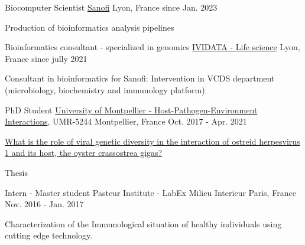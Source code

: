 

\begin{cventries}

 \cventry
    {Biocomputer Scientist} %
    {\href{https://www.sanofi.com/en}{Sanofi}} %
    {Lyon, France} %
    {since Jan. 2023} %
    {
      \begin{cvitems} %
        \item {Production of bioinformatics analysis pipelines}
      \end{cvitems}
    }

 \cventry
    {Bioinformatics consultant - specialized in genomics} %
    {\href{https://www.ividata.com/}{IVIDATA - Life science}} %
    {Lyon, France} %
    {since jully 2021} %
    {
      \begin{cvitems} %
        \item {Consultant in bioinformatics for Sanofi: Intervention in VCDS department (microbiology, biochemistry and immunology platform)}
      \end{cvitems}
    }
    
   \cventry
    {PhD Student}%
    {\href{http://ihpe.univ-perp.fr/}{University of Montpellier - Host-Pathogen-Environment Interactions}, UMR-5244} %
    {Montpellier, France} %
    {Oct. 2017 - Apr. 2021} %
    {
      \begin{cvitems} %
        \item {\href{https://www.theses.fr/2021MONTG012}{What is the role of viral genetic diversity in the interaction of ostreid herpesvirus 1 and its host, the oyster crassostrea gigas?}}
        \item {Thesis}
      \end{cvitems}
    }
  \cventry
    {Intern - Master student} %
    {Pasteur Institute - LabEx Milieu Interieur} %
    {Paris, France} %
    {Nov. 2016 - Jan. 2017} %
    {
      \begin{cvitems} %
        \item {Characterization of the Immunological situation of healthy individuals using cutting edge technology.}
      \end{cvitems}
    }


\end{cventries}
